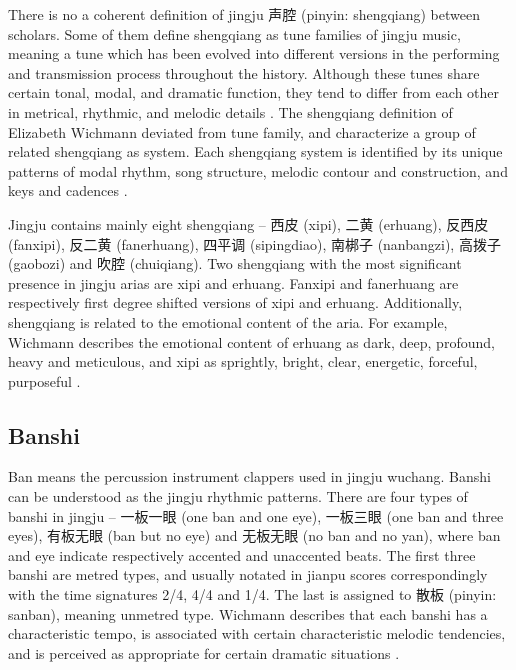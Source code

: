 There is no a coherent definition of jingju 声腔 (pinyin: shengqiang) between scholars. Some of them define shengqiang as tune families of jingju music, meaning a tune which has been evolved into different versions in the performing and transmission process throughout the history. Although these tunes share certain tonal, modal, and dramatic function, they tend to differ from each other in metrical, rhythmic, and melodic details \cite{Yung1989a}. The shengqiang definition of Elizabeth Wichmann deviated from tune family, and characterize a group of related shengqiang as system. Each shengqiang system is identified by its unique patterns of modal rhythm, song structure, melodic contour and construction, and keys and cadences \cite{Wichmann1991a}.  

Jingju contains mainly eight shengqiang -- 西皮 (xipi), 二黄 (erhuang), 反西皮 (fanxipi), 反二黄 (fanerhuang), 四平调 (sipingdiao), 南梆子 (nanbangzi), 高拨子 (gaobozi) and 吹腔 (chuiqiang). Two shengqiang with the most significant presence in jingju arias are xipi and erhuang. Fanxipi and fanerhuang are respectively first degree shifted versions of xipi and erhuang. Additionally, shengqiang is related to the emotional content of the aria. For example, Wichmann describes the emotional content of erhuang as dark, deep, profound, heavy and meticulous, and xipi as sprightly, bright, clear, energetic, forceful, purposeful \cite{Wichmann1991a}. 

\subsection{Banshi}\label{sec:banshi}

Ban means the percussion instrument clappers used in jingju wuchang. Banshi can be understood as the jingju rhythmic patterns.  There are four types of banshi in jingju -- 一板一眼 (one ban and one eye), 一板三眼 (one ban and three eyes), 有板无眼 (ban but no eye) and 无板无眼 (no ban and no yan), where ban and eye indicate respectively accented and unaccented beats. The first three banshi are metred types, and usually notated in jianpu scores correspondingly with the time signatures 2/4, 4/4 and 1/4. The last is assigned to 散板 (pinyin: sanban), meaning unmetred type. Wichmann describes that each banshi has a characteristic tempo, is associated with certain characteristic melodic tendencies, and is perceived as appropriate for certain dramatic situations \cite{Wichmann1991a}. 

